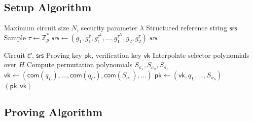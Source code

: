 \documentclass[11pt,a4paper]{article}
\newcommand{\Z}{\mathbb{Z}}
\newcommand{\com}{\mathsf{com}}
\begin{document}
\subsection{Setup Algorithm}

\begin{algorithm}
\caption{PLONK Universal Setup}
\label{alg:plonk-setup}
\begin{algorithmic}[1]
\Require Maximum circuit size $N$, security parameter $\lambda$
\Ensure Structured reference string $\mathsf{srs}$
\State Sample $\tau \gets \Z_p^*$
\State $\mathsf{srs} \gets (g_1, g_1^\tau, g_1^{\tau^2}, \ldots, g_1^{\tau^N}, g_2, g_2^\tau)$
\State \Return $\mathsf{srs}$
\end{algorithmic}
\end{algorithm}

\begin{algorithm}
\caption{PLONK Circuit Preprocessing}
\label{alg:plonk-preprocess}
\begin{algorithmic}[1]
\Require Circuit $\mathcal{C}$, $\mathsf{srs}$
\Ensure Proving key $\mathsf{pk}$, verification key $\mathsf{vk}$
\State Interpolate selector polynomials over $H$
\State Compute permutation polynomials $S_{\sigma_1}, S_{\sigma_2}, S_{\sigma_3}$
\State $\mathsf{vk} \gets (\com(q_L), \ldots, \com(q_C), \com(S_{\sigma_1}), \ldots)$
\State $\mathsf{pk} \gets (\mathsf{vk}, q_L, \ldots, S_{\sigma_3})$
\State \Return $(\mathsf{pk}, \mathsf{vk})$
\end{algorithmic}
\end{algorithm}

\subsection{Proving Algorithm}
\end{document}
